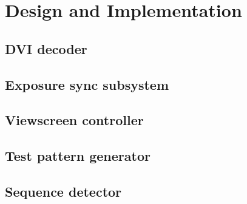 \chapter{Design and Implementation}





\section{DVI decoder}

\section{Exposure sync subsystem}

\section{Viewscreen controller}
\section{Test pattern generator}
\section{Sequence detector}